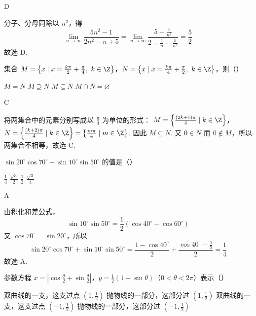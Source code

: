 \documentclass[UTF8,a4paper,oneside,11pt]{ctexbook}
\begin{document}
\begin{answer}
D
\end{answer}

\begin{solution}
分子、分母同除以 \(n^2\)，得
\[
\lim_{n\to\infty}\frac{5n^2-1}{2n^2-n+5}
=\lim_{n\to\infty}\frac{5-\frac1{n^2}}{2-\frac1n+\frac5{n^2}}
=\frac52
\]
故选 D.
\end{solution}

\begin{problem}
集合 \(M=\left\{x\mid x=\frac{k\pi}{2}+\frac{\pi}{4},\ k\in\Z\right\}\)，\(N=\left\{x\mid x=\frac{k\pi}{4}+\frac{\pi}{2},\ k\in\Z\right\}\)，则（\quad）

\choices
    {\(M=N\)}
    {\(M\supseteq N\)}
    {\(M\subseteq N\)}
    {\(M\cap N=\varnothing\)}
\end{problem}

\begin{answer}
C
\end{answer}

\begin{solution}
将两集合中的元素分别写成以 \(\frac\pi4\) 为单位的形式：
\(M=\left\{\frac{(2k+1)\pi}{4}\mid k\in\Z\right\}\)，\(N=\left\{\frac{(k+2)\pi}{4}\mid k\in\Z\right\} =\left\{\frac{m\pi}{4}\mid m\in\Z\right\}\).
因此 \(M\subseteq N\). 又 \(0\in N\) 而 \(0\notin M\)，所以两集合不相等，故选 C.
\end{solution}

\begin{problem}
\(\sin 20^\circ\cos 70^\circ+\sin 10^\circ\sin 50^\circ\) 的值是（\quad）

\choices
    {\(\frac{1}{4}\)}
    {\(\frac{\sqrt{3}}{2}\)}
    {\(\frac{1}{2}\)}
    {\(\frac{\sqrt{3}}{4}\)}
\end{problem}

\begin{answer}
A
\end{answer}

\begin{solution}
由积化和差公式，
\[
\sin10^\circ\sin50^\circ
=\frac12\left(\cos40^\circ-\cos60^\circ\right)
\]
又 \(\cos70^\circ=\sin20^\circ\)，所以
\[
\sin20^\circ\cos70^\circ+\sin10^\circ\sin50^\circ
=\frac{1-\cos40^\circ}{2}
+\frac{\cos40^\circ-\frac12}{2}
=\frac14
\]
故选 A.
\end{solution}

\begin{problem}
参数方程 \(x=\left|\cos\frac{\theta}{2}+\sin\frac{\theta}{2}\right|\)，\(y=\frac{1}{2}(1+\sin\theta)\)（\(0<\theta<2\pi\)）表示（\quad）

\choices
    {双曲线的一支，这支过点 \(\left(1,\frac{1}{2}\right)\)}
    {抛物线的一部分，这部分过 \(\left(1,\frac{1}{2}\right)\)}
    {双曲线的一支，这支过点 \(\left(-1,\frac{1}{2}\right)\)}
    {抛物线的一部分，这部分过 \(\left(-1,\frac{1}{2}\right)\)}
\end{problem}
\end{document}
